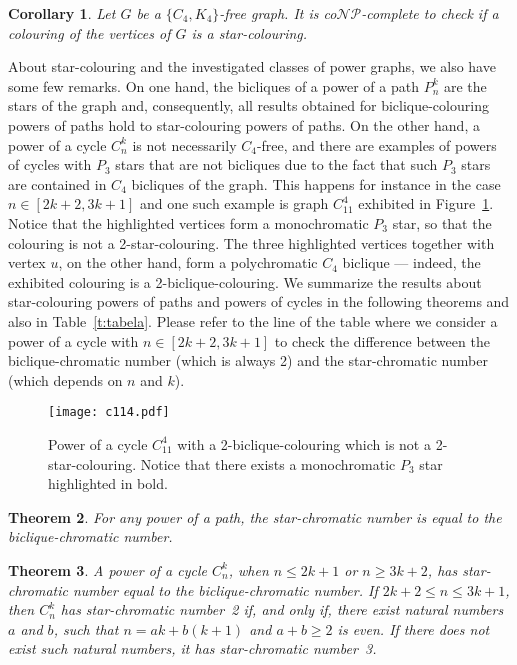 \documentclass{article}
\newtheorem{theorem}{Theorem}
\newtheorem{corollary}[theorem]{Corollary}
\begin{document}
\begin{corollary}
Let $G$ be a $\{C_4, K_4\}$-free graph. It is co$\mathcal{NP}$-complete to
check if a colouring of the vertices of $G$ is a star-colouring.
\end{corollary}

About star-colouring and the investigated classes of power graphs,
we also have some few remarks. On one hand, the bicliques of a power of a path $P_n^k$ are
the stars of the graph and, consequently, all results obtained for
biclique-colouring powers of paths hold to star-colouring powers of paths.
On the other hand, a power of a cycle $C_n^k$ is not necessarily $C_4$-free, and
there are examples of powers of cycles with $P_3$ stars that are not bicliques
due to the fact that such $P_3$ stars are contained in $C_4$ bicliques of the
graph. This happens for instance in the case $n \in [2k+2, 3k+1]$ and one such
example is graph $C_{11}^4$ exhibited in Figure~\ref{fig:c114}. Notice that the highlighted
vertices form a monochromatic $P_3$ star, so that the colouring is not a
2-star-colouring. The three highlighted vertices together with vertex $u$, on
the other hand, form a polychromatic $C_4$ biclique --- indeed, the
exhibited colouring is a 2-biclique-colouring. 
We summarize the results about star-colouring powers of paths and powers of
cycles in the following theorems and also in Table~\ref{t:tabela}. Please refer
to the line of the table where we consider a power of a cycle with $n \in
[2k+2, 3k+1]$ to check the difference between the biclique-chromatic number
(which is always 2) and the star-chromatic number (which depends on $n$ and
$k$).

\begin{figure}[t]
\centering
	\texttt{[image: c114.pdf]}
	\caption{Power of a cycle $C_{11}^{4}$ with a
	2-biclique-colouring which is not a 2-star-colouring. 
	Notice that there exists a monochromatic $P_{3}$ star
	highlighted in bold.}
	\label{fig:c114}
\end{figure}

\begin{theorem}
For any power of a path, the star-chromatic number is equal to the
biclique-chromatic number.
\end{theorem}


\begin{theorem}
A power of a cycle $C_n^k$, when $n \leq 2k + 1$ or $n \geq 3k+2$, has
star-chromatic number equal to the biclique-chromatic number.
If $2k + 2 \leq n \leq 3k + 1$, then $C_n^k$ has star-chromatic number~2 if, and
only if, there exist natural numbers $a$ and $b$, such that $n = ak + b(k+1)$ and
$a + b \geq 2$ is even. If there does not exist such natural numbers, it has
star-chromatic number~3.
\end{theorem}
\end{document}
